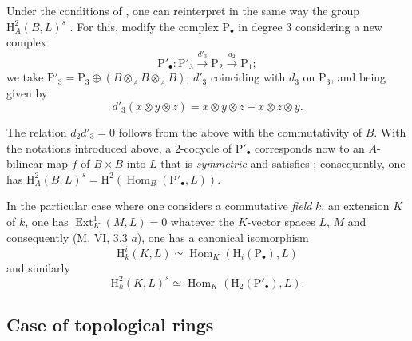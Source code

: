 \begin{env}[18.4.5]
\label{0.18.4.5}
Under the conditions of , one can reinterpret in the same way the group $\mathrm{H}^2_A(B,L)^s$ .
For this, modify the complex $\mathrm{P}_\bullet$ in degree $3$ considering a new complex
\[
  \mathrm{P}'_\bullet:\mathrm{P}'_3\xrightarrow{d'_3}\mathrm{P}_2\xrightarrow{d_2}\mathrm{P}_1;
\]
we take $\mathrm{P}'_3=\mathrm{P}_3\oplus(B\otimes_A B\otimes_A B)$, $d'_3$ coinciding with $d_3$ on $\mathrm{P}_3$, and being given by
\[
  d'_3(x\otimes y\otimes z)=x\otimes y\otimes z-x\otimes z\otimes y.
\]

The relation $d_2 d'_3=0$ follows from the above with the commutativity of $B$.
With the notations introduced above, a $2$-cocycle of $\mathrm{P}'_\bullet$ corresponds now to an $A$-bilinear map $f$ of $B\times B$ into $L$ that is \emph{symmetric} and satisfies ; consequently, one has $\mathrm{H}^2_A(B,L)^s=\mathrm{H}^2(\operatorname{Hom}_B(\mathrm{P}'_\bullet,L))$.
\end{env}

\begin{env}[18.4.6]
\label{0.18.4.6}
In the particular case where one considers a commutative \emph{field} $k$, an extension $K$ of $k$, one has $\operatorname{Ext}^1_K(M,L)=0$ whatever the $K$-vector spaces $L$, $M$ and consequently (M, VI, 3.3 $a$), one has a canonical isomorphism
\begin{equation}
\tag{18.4.6.1}
  \label{0.18.4.6.1}
  \mathrm{H}^i_k(K,L)\simeq\operatorname{Hom}_K(\mathrm{H}_i(\mathrm{P}_\bullet),L)
\end{equation}
and similarly
\begin{equation}
\tag{18.4.6.2}
  \label{0.18.4.6.2}
  \mathrm{H}^2_k(K,L)^s\simeq\operatorname{Hom}_K(\mathrm{H}_2(\mathrm{P}'_\bullet),L).
\end{equation}
\end{env}

\subsection{Case of topological rings}
\label{subsection:0.18.5}

